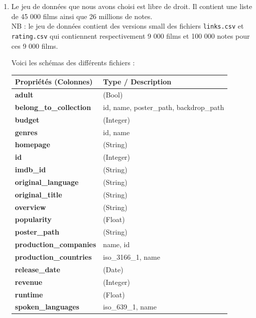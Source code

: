 \documentclass[a4paper,12pt]{report}
\begin{document}
\begin{enumerate}[label=A.\arabic*, leftmargin=1.7cm]
    \newpage
    \label{JD2}
    \item Le jeu de données que nous avons choisi est libre de droit. Il contient une liste de 45 000 films ainsi que 26 millions de notes.\\
    NB : le jeu de données contient des versions small des fichiers \texttt{links.csv} et \texttt{rating.csv} qui contiennent respectivement 9 000 films et 100 000 notes pour ces 9 000 films.
    
    Voici les schémas des différents fichiers :

        \begin{table}[h]
            \centering
            \small
            \begin{tabular}{@{}ll@{}}
                \toprule
                \textbf{Propriétés (Colonnes)} & \textbf{Type / Description} \\
                \midrule
                \textbf{adult} & (Bool)\\
                \textbf{belong\_to\_collection} & id, name, poster\_path, backdrop\_path\\
                \textbf{budget} & (Integer)\\
                \textbf{genres} & id, name\\
                \textbf{homepage} & (String)\\
                \textbf{id} & (Integer)\\
                \textbf{imdb\_id} & (String)\\
                \textbf{original\_language} & (String)\\
                \textbf{original\_title} & (String)\\
                \textbf{overview} & (String)\\
                \textbf{popularity} & (Float)\\
                \textbf{poster\_path} & (String)\\
                \textbf{production\_companies} & name, id\\
                \textbf{production\_countries} & iso\_3166\_1, name\\
                \textbf{release\_date} & (Date)\\
                \textbf{revenue} & (Integer)\\
                \textbf{runtime} & (Float)\\
                \textbf{spoken\_languages} & iso\_639\_1, name \\

\end{tabular}
\end{table}
\end{enumerate}
\end{document}
